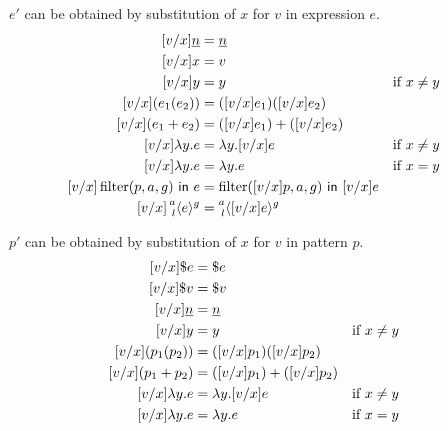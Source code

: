  \(e'\) can be obtained by substitution of \(x\) for
\(v\) in expression \(e\).
\[
  \begin{aligned}
    [v / x] \Nat{n} &= \Nat{n} \\
    [v / x] x &= v \\
    [v / x] y &= y && \text{if } x \neq y \\
    [v / x] (e_1(e_2)) &= ([v / x] e_1)([v / x] e_2) \\
    [v / x] (e_1 + e_2) &= ([v / x] e_1) + ([v / x] e_2) \\
    [v / x] \Lam{y}{e} &= \Lam{y}{[v / x] e} && \text{if } x \neq y \\
    [v / x] \Lam{y}{e} &= \Lam{y}{e} && \text{if } x = y \\
    [v / x] \Filter{(p, a, g)}{e} &= \Filter{([v / x]p, a, g)}{[v / x] e} \\
    [v / x] \Residue{a}{g}{l}{e} &= \Residue{a}{g}{l}{[v / x] e} \\
  \end{aligned}
\]

 \(p'\) can be obtained by substitution of \(x\) for
\(v\) in pattern \(p\).
\[
  \begin{aligned}
    [v / x] \$e &= \$e \\
    [v / x] \$v &= \$v \\
    [v / x] \Nat{n} &= \Nat{n} \\
    [v / x] y &= y && \text{if } x \neq y \\
    [v / x] (p_1(p_2)) &= ([v / x] p_1)([v / x] p_2) \\
    [v / x] (p_1 + p_2) &= ([v / x] p_1) + ([v / x] p_2) \\
    [v / x] \Lam{y}{e} &= \Lam{y}{[v / x] e} && \text{if } x \neq y \\
    [v / x] \Lam{y}{e} &= \Lam{y}{e} && \text{if } x = y \\
  \end{aligned}
\]








